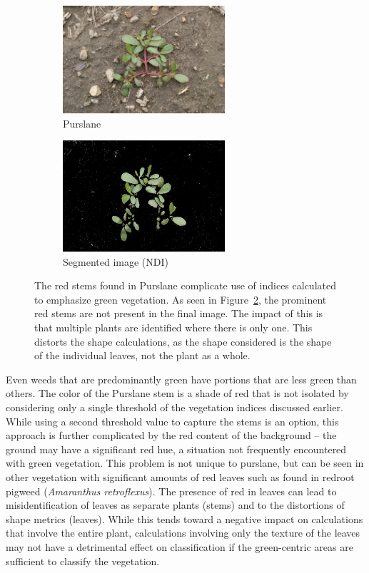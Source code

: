 \documentclass[letterpaper, notitlepage]{report}
\begin{document}
\begin{figure}[h!]
	\centering
	\begin{subfigure}[h]{.40\textwidth}
		\centering
		\includegraphics[width=6cm]{./figures/purslane.png}
		\caption{Purslane}
		\label{fig:purslane}
	\end{subfigure}
	\begin{subfigure}[h]{.40\textwidth}
		\centering
		\includegraphics[width=6cm]{./figures/purslane-segmented.jpg}
		\caption{Segmented image (NDI)}
		\label{fig:purslane-segmented}
	\end{subfigure}
	\caption[Color problems complicate segmentation]{The red stems found in Purslane complicate use of indices calculated to emphasize green vegetation. As seen in Figure~\ref{fig:purslane-segmented}, the prominent red stems are not present in the final image. The impact of this is that multiple plants are identified where there is only one. This distorts the shape calculations, as the shape considered is the shape of the individual leaves, not the plant as a whole.}
	\label{fig:segmentation-problem}
\end{figure}

Even weeds that are predominantly green have portions that are less green than others. The color of the Purslane stem is a shade of red that is not isolated by considering only a single threshold of the vegetation indices discussed earlier. While using a second threshold value to capture the stems is an option, this approach is further complicated by the red content of the background -- the ground may have a significant red hue, a situation not frequently encountered with green vegetation. This problem is not unique to purslane, but can be seen in other vegetation with significant amounts of red leaves such as found in redroot pigweed (\textit{Amaranthus retroflexus}).  The presence of red in leaves can lead to misidentification of leaves as separate plants (stems) and to the distortions of shape metrics (leaves). While this tends toward a negative impact on calculations that involve the entire plant, calculations involving only the texture of the leaves may not have a detrimental effect on classification if the green-centric areas are sufficient to classify the vegetation.
\end{document}
